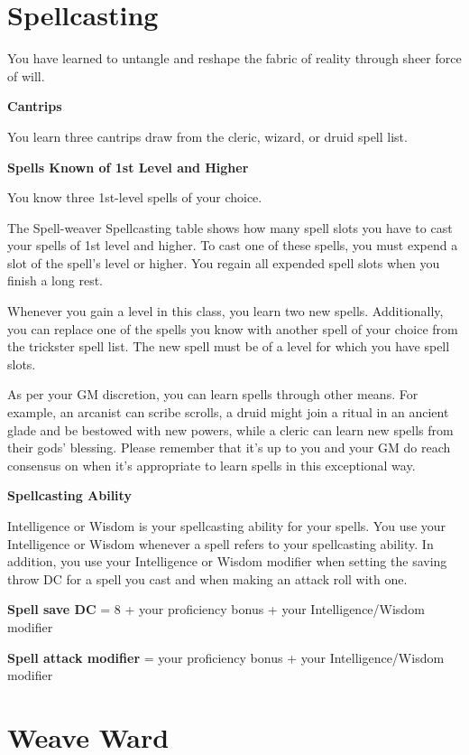 \begin{multicols*}{2}
\section*{Spellcasting}

You have learned to untangle and reshape the fabric of reality through sheer force of will.

\textbf{Cantrips}

You learn three cantrips draw from the cleric, wizard, or druid spell list. 


\textbf{Spells Known of 1st Level and Higher}

You know three 1st-level spells of your choice.

The Spell-weaver Spellcasting table shows how many spell slots you have to cast your spells of 1st level and higher. To cast one of these spells, you must expend a slot of the spell's level or higher. You regain all expended spell slots when you finish a long rest.


Whenever you gain a level in this class, you learn two new spells. Additionally, you can replace one of the spells you know with another spell of your choice from the trickster spell list. The new spell must be of a level for which you have spell slots.

As per your GM discretion, you can learn spells through other means. For example, an arcanist can scribe scrolls, a druid might join a ritual in an ancient glade and be bestowed with new powers, while a cleric can learn new spells from their gods' blessing.
Please remember that it's up to you and your GM do reach consensus on when it's appropriate to learn spells in this exceptional way.

\textbf{Spellcasting Ability}

Intelligence or Wisdom is your spellcasting ability for your spells. You use your Intelligence or Wisdom whenever a spell refers to your spellcasting ability. In addition, you use your Intelligence or Wisdom modifier when setting the saving throw DC for a spell you cast and when making an attack roll with one.

\textbf{Spell save DC} = 8 + your proficiency bonus + your Intelligence/Wisdom modifier

\textbf{Spell attack modifier} = your proficiency bonus + your Intelligence/Wisdom modifier


\section*{Weave Ward}


\end{multicols*}
